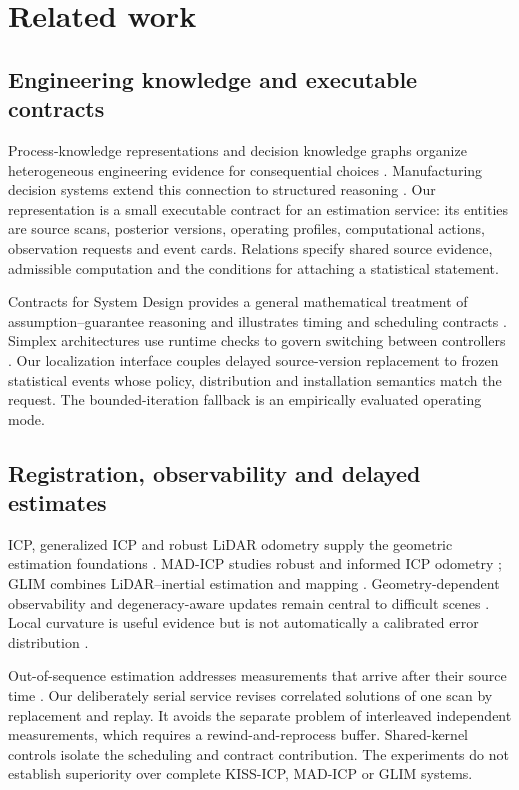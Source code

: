 
\section{Related work}
\subsection{Engineering knowledge and executable contracts}
Process-knowledge representations and decision knowledge graphs organize heterogeneous engineering evidence for consequential choices \cite{wang2021process,hao2021knowledge}. Manufacturing decision systems extend this connection to structured reasoning \cite{su2025manufacturing}. Our representation is a small executable contract for an estimation service: its entities are source scans, posterior versions, operating profiles, computational actions, observation requests and event cards. Relations specify shared source evidence, admissible computation and the conditions for attaching a statistical statement.

Contracts for System Design provides a general mathematical treatment of assumption--guarantee reasoning and illustrates timing and scheduling contracts \cite{benveniste2018contracts}. Simplex architectures use runtime checks to govern switching between controllers \cite{mehmood2022simplex}. Our localization interface couples delayed source-version replacement to frozen statistical events whose policy, distribution and installation semantics match the request. The bounded-iteration fallback is an empirically evaluated operating mode.

\subsection{Registration, observability and delayed estimates}
ICP, generalized ICP and robust LiDAR odometry supply the geometric estimation foundations \cite{besl1992icp,segal2009gicp,pomerleau2015,kiss2023}. MAD-ICP studies robust and informed ICP odometry \cite{ferrari2024mad}; GLIM combines LiDAR--inertial estimation and mapping \cite{glim2024}. Geometry-dependent observability and degeneracy-aware updates remain central to difficult scenes \cite{xicp2024,drpm2024}. Local curvature is useful evidence but is not automatically a calibrated error distribution \cite{censi2007,bonnabel2016}.

Out-of-sequence estimation addresses measurements that arrive after their source time \cite{barshalom2002}. Our deliberately serial service revises correlated solutions of one scan by replacement and replay. It avoids the separate problem of interleaved independent measurements, which requires a rewind-and-reprocess buffer. Shared-kernel controls isolate the scheduling and contract contribution. The experiments do not establish superiority over complete KISS-ICP, MAD-ICP or GLIM systems.

